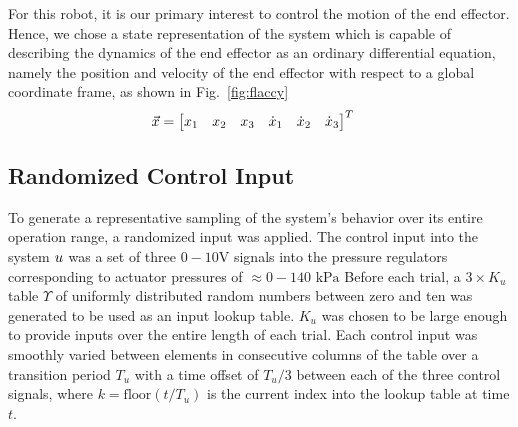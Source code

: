 For this robot, it is our primary interest to control the motion of the end effector.
Hence, we chose a state representation of the system which is capable of describing the dynamics of the end effector as an ordinary differential equation, namely the position and velocity of the end effector with respect to a global coordinate frame, as shown in Fig.~\ref{fig:flaccy}
\begin{align}
    \vec{x} &= \begin{bmatrix}  x_1 & x_2 & x_3 & \dot{x}_1 & \dot{x}_2 & \dot{x}_3  \end{bmatrix}^T
    \label{eq:state}
\end{align}

\subsection{Randomized Control Input}

To generate a representative sampling of the system's behavior over its entire operation range, a randomized input was applied.
The control input into the system $u$ was a set of three $0-10 \text{V}$ signals into the pressure regulators corresponding to actuator pressures of $\approx 0-140 \text{ kPa}$
Before each trial, a $3 \times K_u$ table $\Upsilon$ of uniformly distributed random numbers between zero and ten was generated to be used as an input lookup table.
$K_u$ was chosen to be large enough to provide inputs over the entire length of each trial.
Each control input was smoothly varied between elements in consecutive columns of the table over a transition period $T_u$ with a time offset of $T_u / 3$ between each of the three control signals,
where $k = \text{floor}\left( {t} / {T_u} \right)$ is the current index into the lookup table at time $t$. 

